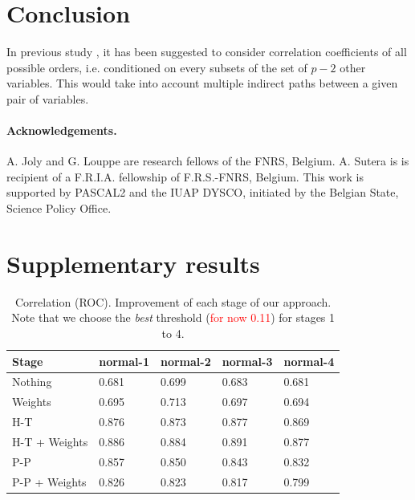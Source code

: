 \documentclass[wcp]{jmlr}
\begin{document}
\section{Conclusion}

In previous study \cite{shipley2002cause}, it has been suggested to
consider correlation coefficients of all possible orders,
i.e. conditioned on every subsets of the set of $p-2$ other variables. This
would take into account multiple indirect paths between a given pair of
variables.





\begin{scriptsize}

\paragraph{Acknowledgements.} A. Joly and G. Louppe are research fellows of
the FNRS, Belgium.  A. Sutera is  is recipient of
a F.R.I.A. fellowship of F.R.S.-FNRS, Belgium.
This work is supported by PASCAL2 and the IUAP DYSCO, initiated by the
Belgian State, Science Policy Office.

\end{scriptsize}

\newpage
\clearpage



\newpage
\clearpage

\appendix

\section{Supplementary results}

\begin{table}[htbp]
\centering
\caption{Correlation (ROC). Improvement of each stage of our approach. Note that we choose the
         \textit{best} threshold (\textcolor{red}{for now 0.11}) for stages 1 to 4.}
\begin{tabular}{*{5}{l}}
\toprule
Stage               & normal-1 & normal-2 & normal-3 & normal-4 \\
\midrule
Nothing             & 0.681 & 0.699 & 0.683 & 0.681\\
Weights             & 0.695 & 0.713 & 0.697 & 0.694\\
H-T                 & 0.876 & 0.873 & 0.877 & 0.869\\
H-T + Weights       & 0.886 & 0.884 & 0.891 & 0.877\\
P-P                 & 0.857 & 0.850 & 0.843 & 0.832\\
P-P + Weights       & 0.826 & 0.823 & 0.817 & 0.799\\
\bottomrule
\end{tabular}
\end{table}
\end{document}
